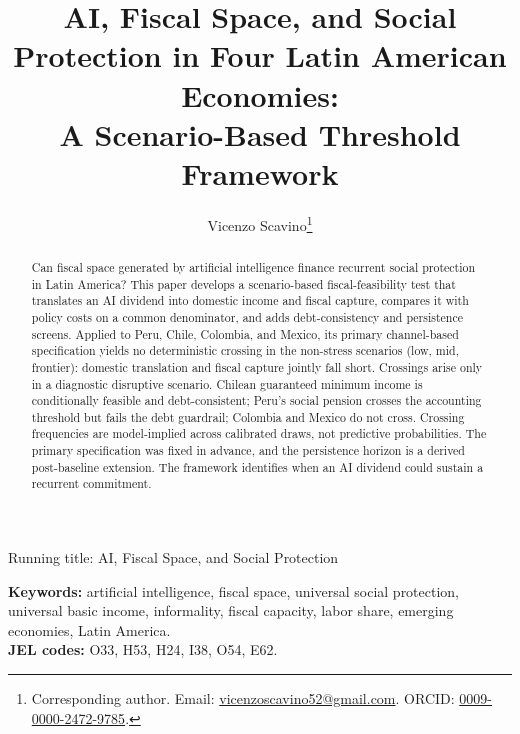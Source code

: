 \documentclass[11pt,a4paper]{article}
\title{AI, Fiscal Space, and Social Protection in Four Latin American Economies:\\[0.2em]
A Scenario-Based Threshold Framework}
\author{Vicenzo Scavino\thanks{Corresponding author. Email: \href{mailto:vicenzoscavino52@gmail.com}{vicenzoscavino52@gmail.com}. ORCID: \href{https://orcid.org/0009-0000-2472-9785}{0009-0000-2472-9785}.}}
\affil{Independent Researcher, Lima, Peru}
\date{}
\begin{document}
\maketitle

\begin{center}\small Running title: AI, Fiscal Space, and Social Protection\end{center}

\begin{abstract}
Can fiscal space generated by artificial intelligence finance recurrent social protection in Latin America? This paper develops a scenario-based fiscal-feasibility test that translates an AI dividend into domestic income and fiscal capture, compares it with policy costs on a common denominator, and adds debt-consistency and persistence screens. Applied to Peru, Chile, Colombia, and Mexico, its primary channel-based specification yields no deterministic crossing in the non-stress scenarios (low, mid, frontier): domestic translation and fiscal capture jointly fall short. Crossings arise only in a diagnostic disruptive scenario. Chilean guaranteed minimum income is conditionally feasible and debt-consistent; Peru's social pension crosses the accounting threshold but fails the debt guardrail; Colombia and Mexico do not cross. Crossing frequencies are model-implied across calibrated draws, not predictive probabilities. The primary specification was fixed in advance, and the persistence horizon is a derived post-baseline extension. The framework identifies when an AI dividend could sustain a recurrent commitment.
\end{abstract}

\noindent \textbf{Keywords:} artificial intelligence, fiscal space, universal social protection, universal basic income, informality, fiscal capacity, labor share, emerging economies, Latin America.\\
\textbf{JEL codes:} O33, H53, H24, I38, O54, E62.

\newpage










\appendix



\end{document}
